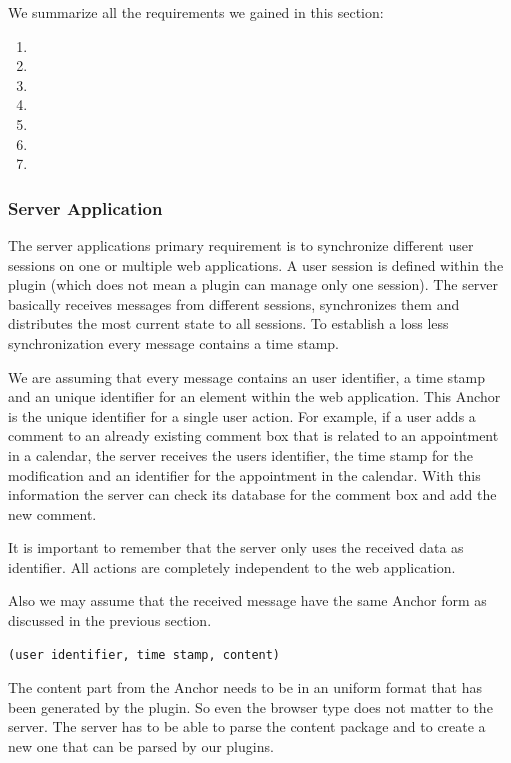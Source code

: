 We summarize all the requirements we gained in this section:

\begin{enumerate}
\item \reqPi
\item \reqPii
\item \reqPiii
\item \reqPiv
\item \reqPv
\item \reqPvi
\item \reqPvii
\end{enumerate}

\subsubsection{Server Application} \label{Social Weaver - Server Application}
The server applications primary requirement is to synchronize different user sessions on one or multiple web applications. A user session is defined within the plugin (which does
 not
 mean a plugin can manage only one session). The server basically receives messages from different sessions, synchronizes them and distributes the most current state to all sessions.  To establish a loss less synchronization every message contains a time stamp.

We are assuming that every message contains an user identifier, a time stamp and an unique identifier for an element within the web application. This Anchor is the unique identifier for a single user action. For example, if a user adds a comment to an already existing comment box that is related to an appointment in a calendar, the server receives the users identifier, the time stamp for the modification and an identifier for the appointment in the calendar. With this information the server can check its database for the comment box and add the new comment. 

It is important to remember that the server only uses the received data as identifier. All actions are completely independent to the web application. 

Also we may assume that the received message have the same Anchor form as discussed in the previous section. 
\begin{verbatim}(user identifier, time stamp, content)\end{verbatim} 
The content part from the Anchor needs to be in an uniform format that has been generated by the plugin. So even the browser type does
 not
 matter to the server. The server has to be able to parse the content package and to create a new one that can be parsed by our plugins.

